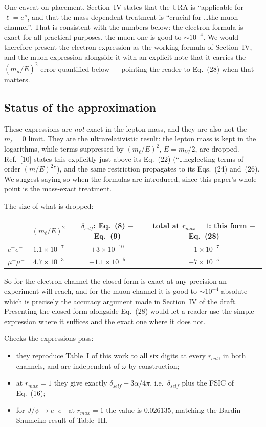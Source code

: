 \documentclass[11pt]{article}
\begin{document}
One caveat on placement. Section~IV states that the URA is ``applicable for
$\ell=e$'', and that the mass-dependent treatment is ``crucial for \ldots the
muon channel''. That is consistent with the numbers below: the electron formula
is exact for all practical purposes, the muon one is good to $\sim10^{-4}$. We
would therefore present the electron expression as the working formula of
Section~IV, and the muon expression alongside it with an explicit note that it
carries the $(m_\mu/E)^{2}$ error quantified below --- pointing the reader to
Eq.~(28) when that matters.

\subsection*{Status of the approximation}

These expressions are \emph{not} exact in the lepton mass, and they are also not
the $m_\ell=0$ limit. They are the ultrarelativistic result: the lepton mass is
kept in the logarithms, while terms suppressed by $(m_\ell/E)^{2}$, $E=m_V/2$,
are dropped. Ref.~[10] states this explicitly just above its Eq.~(22)
(``\ldots neglecting terms of order $(m/E)^{2}$''), and the same restriction
propagates to its Eqs.~(24) and~(26). We suggest saying so when the formulas are
introduced, since this paper's whole point is the mass-exact treatment.

The size of what is dropped:
\begin{center}
\begin{tabular}{lccc}
\toprule
 & $(m_\ell/E)^{2}$ & $\delta_{self}$: Eq.~(8) $-$ Eq.~(9) & total at $r_{max}=1$: this form $-$ Eq.~(28)\\
\midrule
$e^+e^-$     & $1.1\times10^{-7}$ & $+3\times10^{-10}$ & $+1\times10^{-7}$\\
$\mu^+\mu^-$ & $4.7\times10^{-3}$ & $+1.1\times10^{-5}$ & $-7\times10^{-5}$\\
\bottomrule
\end{tabular}
\end{center}
So for the electron channel the closed form is exact at any precision an
experiment will reach, and for the muon channel it is good to $\sim10^{-4}$
absolute --- which is precisely the accuracy argument made in Section~IV of the
draft. Presenting the closed form alongside Eq.~(28) would let a reader use the
simple expression where it suffices and the exact one where it does not.

Checks the expressions pass:
\begin{itemize}
\item they reproduce Table~I of this work to all six digits at every $r_{cut}$,
      in both channels, and are independent of $\omega$ by construction;
\item at $r_{max}=1$ they give exactly $\delta_{self}+3\alpha/4\pi$, i.e.\
      $\delta_{self}$ plus the FSIC of Eq.~(16);
\item for $J/\psi\to e^+e^-$ at $r_{max}=1$ the value is $0.026135$, matching the
      Bardin--Shumeiko result of Table~III.
\end{itemize}
\end{document}
